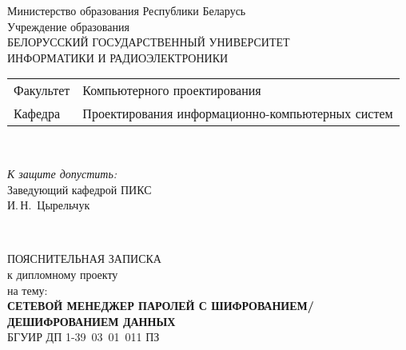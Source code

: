 \begin{titlepage}
  \begin{center}
    Министерство образования Республики Беларусь\\[1em]
    Учреждение образования\\
    БЕЛОРУССКИЙ ГОСУДАРСТВЕННЫЙ УНИВЕРСИТЕТ \\
    ИНФОРМАТИКИ И РАДИОЭЛЕКТРОНИКИ\\[1em]

    \begin{minipage}{\textwidth}
      \begin{flushleft}
        \begin{tabular}{ l l }
          Факультет & Компьютерного проектирования\\
          Кафедра   & Проектирования информационно-компьютерных систем
        \end{tabular}
      \end{flushleft}
    \end{minipage}\\[1em]

    \begin{flushright}
      \begin{minipage}{0.4\textwidth}
        \textit{К защите допустить:}\\[0.8em]
        Заведующий кафедрой ПИКС\\[0.45em]
        \underline{\hspace*{2.8cm}} И.\,Н.~Цырельчук
      \end{minipage}\\[2.2em]
    \end{flushright}

    {ПОЯСНИТЕЛЬНАЯ ЗАПИСКА}\\
    {к дипломному проекту}\\
    {на тему:}\\[1em]
    \textbf{\large СЕТЕВОЙ МЕНЕДЖЕР ПАРОЛЕЙ С ШИФРОВАНИЕМ/ДЕШИФРОВАНИЕМ ДАННЫХ}\\[1em]


    {БГУИР ДП 1-39 03 01 011 ПЗ}\\[2em]


\end{center}
\end{titlepage}
